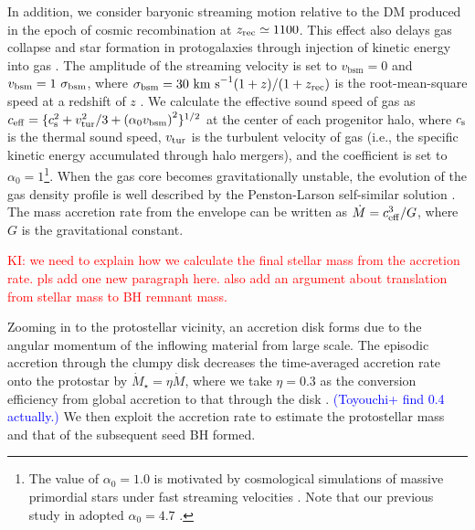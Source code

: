 \documentclass[twocolumn, twocolappendix]{aastex63}
\newcommand{\vbsm}{v_\mathrm{bsm}}
\newcommand{\Mdot}{\dot{M}}
\newcommand{\red}[1]{\textcolor{red}{ #1}}
\newcommand{\blue}[1]{\textcolor{blue}{ #1}}
\begin{document}
\begin{CJK*}{UTF8}{gbsn}
In addition, we consider baryonic streaming motion relative to the DM produced in the epoch of cosmic recombination at $z_{\rm rec} \simeq 1100$.
This effect also delays gas collapse and star formation in protogalaxies through injection of kinetic energy into gas
\citep[e.g.,][]{2012MNRAS.424.1335F, 2014MNRAS.439.1092T, 2017Sci...357.1375H,2019MNRAS.484.3510S,2021ApJ...917...60L}.
The amplitude of the streaming velocity is set to $\vbsm = 0$ and $\vbsm=1~\sigma_{\rm bsm}$, where $\sigma_{\rm bsm}=30~{\rm km~s}^{-1} (1+z)/(1+z_{\rm rec})$
is the root-mean-square speed at a redshift of $z$ \citep{2010PhRvD..82h3520T}.
We calculate the effective sound speed of gas as $c_{\rm eff} = \{c_{\rm s}^2+v_{\rm tur}^2/3+\left(\alpha_0 \vbsm \right)^2 \}^{1/2}$ at the center of each progenitor halo,
where $c_{\rm s}$ is the thermal sound speed, $v_{\rm tur}$ is the turbulent velocity of gas (i.e., the specific kinetic energy accumulated through halo mergers), and
the coefficient is set to $\alpha_0=1$\footnote{The value of $\alpha_0=1.0$ is motivated by cosmological simulations of massive primordial stars
under fast streaming velocities \citep{2017Sci...357.1375H,2019MNRAS.484.3510S}.
Note that our previous study in \citet{2021ApJ...917...60L} adopted $\alpha_0=4.7$ \citep{2018ApJ...855...17H}.}.
%
When the gas core becomes gravitationally unstable, the evolution of the gas density profile is well described by 
the Penston-Larson self-similar solution \citep{1969MNRAS.144..425P,1969MNRAS.145..271L}. 
The mass accretion rate from the envelope can be written as $\dot{M}=c_{\rm eff}^3/G$,
where $G$ is the gravitational constant.



\red{KI: we need to explain how we calculate the final stellar mass from the accretion rate. pls add one new paragraph here. 
also add an argument about translation from stellar mass to BH remnant mass.}

Zooming in to the protostellar vicinity, an accretion disk forms due to the angular momentum of the inflowing material from large scale. 
The episodic accretion through the clumpy disk decreases the time-averaged accretion rate onto the protostar by $\Mdot_{\star}=\eta \Mdot$, 
where we take $\eta=0.3$ as the conversion efficiency from global accretion to that through the disk \citep[][Toyouchi 2022]{2016MNRAS.459.1137S}. 
\blue{
  (Toyouchi+ find 0.4 actually.)
}
We then exploit the accretion rate to estimate the protostellar mass and that of the subsequent seed BH formed. 


\end{CJK*}
\end{document}
